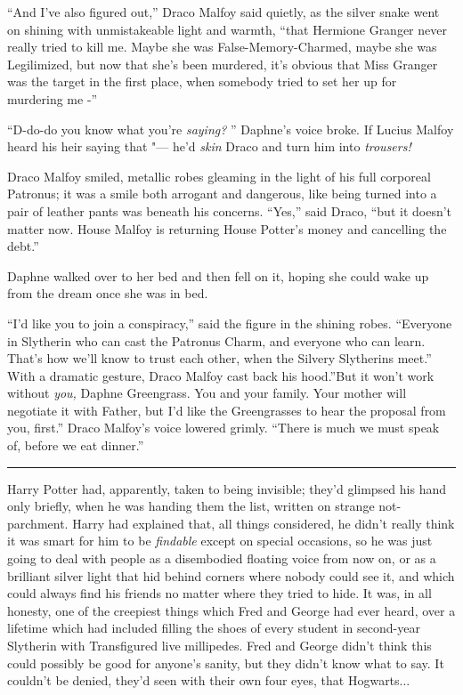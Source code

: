 ``And I've also figured out,'' Draco Malfoy said quietly, as the silver
snake went on shining with unmistakeable light and warmth, ``that
Hermione Granger never really tried to kill me. Maybe she was
False-Memory-Charmed, maybe she was Legilimized, but now that she's been
murdered, it's obvious that Miss Granger was the target in the first
place, when somebody tried to set her up for murdering me -''

``D-do-do you know what you're \emph{saying?} '' Daphne's voice broke. If
Lucius Malfoy heard his heir saying that "--- he'd \emph{skin} Draco and
turn him into \emph{trousers!}

Draco Malfoy smiled, metallic robes gleaming in the light of his full
corporeal Patronus; it was a smile both arrogant and dangerous, like
being turned into a pair of leather pants was beneath his concerns.
``Yes,'' said Draco, ``but it doesn't matter now. House Malfoy is
returning House Potter's money and cancelling the debt.''

Daphne walked over to her bed and then fell on it, hoping she could wake
up from the dream once she was in bed.

``I'd like you to join a conspiracy,'' said the figure in the shining
robes. ``Everyone in Slytherin who can cast the Patronus Charm, and
everyone who can learn. That's how we'll know to trust each other, when
the Silvery Slytherins meet.'' With a dramatic gesture, Draco Malfoy
cast back his hood.''But it won't work without \emph{you,} Daphne
Greengrass. You and your family. Your mother will negotiate it with
Father, but I'd like the Greengrasses to hear the proposal from you,
first.'' Draco Malfoy's voice lowered grimly. ``There is much we must
speak of, before we eat dinner.''

\begin{center}\rule{3in}{0.4pt}\end{center}

Harry Potter had, apparently, taken to being invisible; they'd glimpsed
his hand only briefly, when he was handing them the list, written on
strange not-parchment. Harry had explained that, all things considered,
he didn't really think it was smart for him to be \emph{findable} except
on special occasions, so he was just going to deal with people as a
disembodied floating voice from now on, or as a brilliant silver light
that hid behind corners where nobody could see it, and which could
always find his friends no matter where they tried to hide. It was, in
all honesty, one of the creepiest things which Fred and George had ever
heard, over a lifetime which had included filling the shoes of every
student in second-year Slytherin with Transfigured live millipedes. Fred
and George didn't think this could possibly be good for anyone's sanity,
but they didn't know what to say. It couldn't be denied, they'd seen
with their own four eyes, that Hogwarts...

